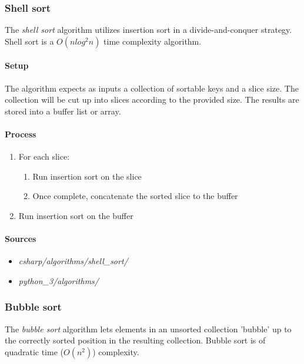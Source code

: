\documentclass{article}
\begin{document}
\subsubsection{Shell sort}
The {\em shell sort} algorithm utilizes insertion sort in a divide-and-conquer strategy.
Shell sort is a \(O(n log^2 n)\) time complexity algorithm.

\paragraph{Setup}
The algorithm expects as inputs a collection of sortable keys and a slice size. The collection will be cut up into
slices according to the provided size. The results are stored into a buffer list or array.

\paragraph{Process}
\begin{enumerate}
\item{For each slice:}
  \begin{enumerate}
  \item{Run insertion sort on the slice}
  \item{Once complete, concatenate the sorted slice to the buffer}
  \end{enumerate}
\item{Run insertion sort on the buffer}
\end{enumerate}

\begin{samepage}
  \paragraph{Sources}
  \begin{itemize}
  \item{{\em csharp/algorithms/shell\_sort/}}
  \item{{\em python\_3/algorithms/}}
  \end{itemize}
\end{samepage}


\subsubsection{Bubble sort}
The {\em bubble sort} algorithm lets elements in an unsorted collection 'bubble' up to the correctly sorted position
in the resulting collection. Bubble sort is of quadratic time (\(O(n^2)\)) complexity.
\end{document}
